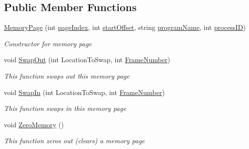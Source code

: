 \subsection*{Public Member Functions}
\begin{DoxyCompactItemize}
\item 
\hyperlink{class_c_p_u___o_s___simulator_1_1_memory_1_1_memory_page_a5befa10c152f468ca7b14157e87a5bd5}{Memory\+Page} (int \hyperlink{class_c_p_u___o_s___simulator_1_1_memory_1_1_memory_page_acf60a7bdefab6120fe080854b5f0b38b}{page\+Index}, int \hyperlink{class_c_p_u___o_s___simulator_1_1_memory_1_1_memory_page_a6fe2e28385db19a1968a41efe3df3f38}{start\+Offset}, string \hyperlink{class_c_p_u___o_s___simulator_1_1_memory_1_1_memory_page_a0607c69f1f03e6c8b63186e0b0f13c3c}{program\+Name}, int \hyperlink{class_c_p_u___o_s___simulator_1_1_memory_1_1_memory_page_a9fbfaef488c3267b6db79d40e6ae521b}{process\+I\+D})
\begin{DoxyCompactList}\small\item\em Constructor for memory page \end{DoxyCompactList}\item 
void \hyperlink{class_c_p_u___o_s___simulator_1_1_memory_1_1_memory_page_a53d6deee146e06754ea770755b17ff14}{Swap\+Out} (int Location\+To\+Swap, int \hyperlink{class_c_p_u___o_s___simulator_1_1_memory_1_1_memory_page_a89857b70d4065fdc15ce2ea577a7f0ff}{Frame\+Number})
\begin{DoxyCompactList}\small\item\em This function swaps out this memory page \end{DoxyCompactList}\item 
void \hyperlink{class_c_p_u___o_s___simulator_1_1_memory_1_1_memory_page_a79e408c1be5efbaa6969ab66cc46930f}{Swap\+In} (int Location\+To\+Swap, int \hyperlink{class_c_p_u___o_s___simulator_1_1_memory_1_1_memory_page_a89857b70d4065fdc15ce2ea577a7f0ff}{Frame\+Number})
\begin{DoxyCompactList}\small\item\em This function swaps in this memory page \end{DoxyCompactList}\item 
void \hyperlink{class_c_p_u___o_s___simulator_1_1_memory_1_1_memory_page_a0c43cf3b2640f17b8d732acbaaaead96}{Zero\+Memory} ()
\begin{DoxyCompactList}\small\item\em This function zeros out (clears) a memory page \end{DoxyCompactList}\end{DoxyCompactItemize}
